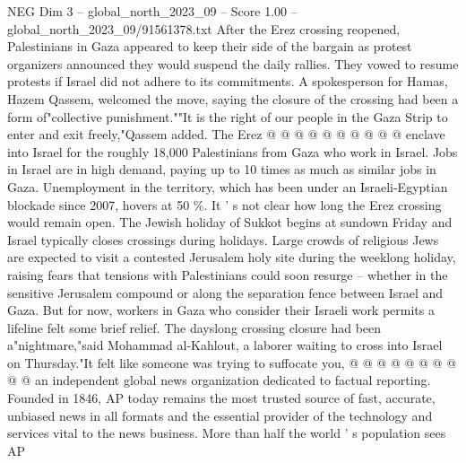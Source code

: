 \begin{textsample}{NEG Dim 3 – global\_north\_2023\_09 – Score 1.00 – global\_north\_2023\_09/91561378.txt}
After the Erez crossing reopened, Palestinians in Gaza appeared to keep their side of the bargain as protest organizers announced they would suspend the daily rallies.
They vowed to resume protests if Israel did not adhere to its commitments.
A spokesperson for Hamas, Hazem Qassem, welcomed the move, saying the closure of the crossing had been a form of"collective punishment.""It is the right of our people in the Gaza Strip to enter and exit freely,"Qassem added.
The Erez @ @ @ @ @ @ @ @ @ @ enclave into Israel for the roughly 18,000 Palestinians from Gaza who work in Israel.
Jobs in Israel are in high demand, paying up to 10 times as much as similar jobs in Gaza.
Unemployment in the territory, which has been under an Israeli-Egyptian blockade since 2007, hovers at 50 \%.
It ' s not clear how long the Erez crossing would remain open.
The Jewish holiday of Sukkot begins at sundown Friday and Israel typically closes crossings during holidays.
Large crowds of religious Jews are expected to visit a contested Jerusalem holy site during the weeklong holiday, raising fears that tensions with Palestinians could soon resurge -- whether in the sensitive Jerusalem compound or along the separation fence between Israel and Gaza.
But for now, workers in Gaza who consider their Israeli work permits a lifeline felt some brief relief.
The dayslong crossing closure had been a"nightmare,"said Mohammad al-Kahlout, a laborer waiting to cross into Israel on Thursday."It felt like someone was trying to suffocate you, @ @ @ @ @ @ @ @ @ @ an independent global news organization dedicated to factual reporting.
Founded in 1846, AP today remains the most trusted source of fast, accurate, unbiased news in all formats and the essential provider of the technology and services vital to the news business.
More than half the world ' s population sees AP

\end{textsample}
